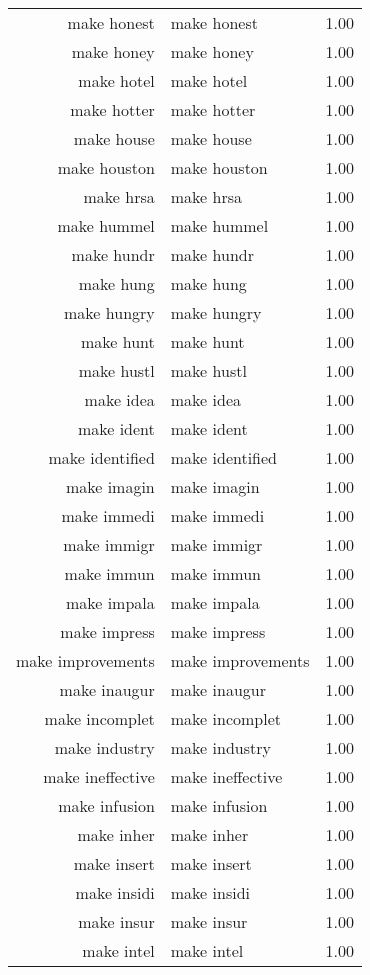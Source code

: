 \begin{table}[ht]
\begin{tabular}{rlr}
  make honest & make honest & 1.00 \\ 
  make honey & make honey & 1.00 \\ 
  make hotel & make hotel & 1.00 \\ 
  make hotter & make hotter & 1.00 \\ 
  make house & make house & 1.00 \\ 
  make houston & make houston & 1.00 \\ 
  make hrsa & make hrsa & 1.00 \\ 
  make hummel & make hummel & 1.00 \\ 
  make hundr & make hundr & 1.00 \\ 
  make hung & make hung & 1.00 \\ 
  make hungry & make hungry & 1.00 \\ 
  make hunt & make hunt & 1.00 \\ 
  make hustl & make hustl & 1.00 \\ 
  make idea & make idea & 1.00 \\ 
  make ident & make ident & 1.00 \\ 
  make identified & make identified & 1.00 \\ 
  make imagin & make imagin & 1.00 \\ 
  make immedi & make immedi & 1.00 \\ 
  make immigr & make immigr & 1.00 \\ 
  make immun & make immun & 1.00 \\ 
  make impala & make impala & 1.00 \\ 
  make impress & make impress & 1.00 \\ 
  make improvements & make improvements & 1.00 \\ 
  make inaugur & make inaugur & 1.00 \\ 
  make incomplet & make incomplet & 1.00 \\ 
  make industry & make industry & 1.00 \\ 
  make ineffective & make ineffective & 1.00 \\ 
  make infusion & make infusion & 1.00 \\ 
  make inher & make inher & 1.00 \\ 
  make insert & make insert & 1.00 \\ 
  make insidi & make insidi & 1.00 \\ 
  make insur & make insur & 1.00 \\ 
  make intel & make intel & 1.00 \\ 

\end{tabular}
\end{table}
